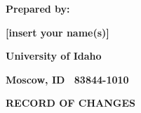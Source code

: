 \documentclass[twoside,letterpaper]{article}
\begin{document}
\bigskip


\bigskip

{\centering{}\bfseries\color{black}
Prepared by:
\par}

{\centering{}\bfseries\color{black}
[insert your name(s)]
\par}

{\centering{}\bfseries\color{black}
University of Idaho
\par}

{\centering{}\bfseries\color{black}
Moscow, ID \ 83844-1010
\par}



\bigskip

{\centering{}\bfseries\color{black}
RECORD OF CHANGES
\par}


\bigskip
\end{document}

